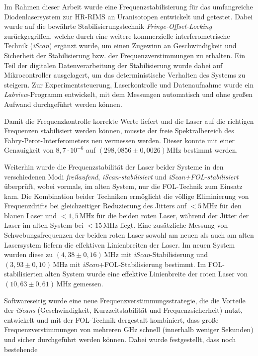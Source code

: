 Im Rahmen dieser Arbeit wurde eine Frequenzstabilisierung für das
umfangreiche Diodenlasersystem zur HR-RIMS an Uranisotopen entwickelt und
getestet. Dabei wurde auf die bewährte Stabilisierungstechnik \textit{Fringe-Offset-Locking} zurückgegriffen, welche
durch eine weitere kommerzielle interferometrische Technik (\textit{iScan})
ergänzt wurde, um einen Zugewinn an Geschwindigkeit und Sicherheit der Stabilisierung bzw. der
Frequenzverstimmungen zu erhalten.
Ein Teil der digitalen Datenverarbeitung der Stabilisierung wurde dabei auf
Mikrocontroller ausgelagert, um das deterministische Verhalten des Systems zu steigern. Zur
Experimentsteuerung, Laserkontrolle und Datenaufnahme wurde ein
\textit{Labview}-Programm entwickelt, mit dem Messungen
automatisch und ohne großen Aufwand durchgeführt werden können.\par
Damit die Frequenzkontrolle korrekte Werte liefert und die Laser auf die
richtigen Frequenzen stabilisiert werden können, musste der freie
Spektralbereich des Fabry-Perot-Interferometers neu vermessen werden. Dieser
konnte mit einer Genauigkeit von $8,7\cdot10^{-6}$ auf $(298,0856\pm0,0026)$MHz
bestimmt werden.\par
Weiterhin wurde die Frequenzstabilität der Laser beider
Systeme in den verschiedenen Modi \textit{freilaufend}, \textit{iScan-stabilisiert} und
\textit{iScan+FOL-stabilisiert} überprüft, wobei vormals, im alten System, nur
die FOL-Technik zum Einsatz kam. Die Kombination beider Techniken ermöglicht die
völlige Eliminierung von Frequenzdrifts bei gleichzeitiger Reduzierung des
Jitters auf $<5\,$MHz für den blauen Laser und $<1,5\,$MHz für die beiden roten
Laser, während der Jitter der Laser im alten System bei 
$<15\,$MHz liegt. Eine zusätzliche Messung von Schwebungsfrequenzen der beiden
roten Laser sowohl am neuen als auch am alten Lasersystem liefern die
effektiven Linienbreiten der Laser. Im neuen System wurden diese zu
$(4,38\pm0,16)\,$MHz mit \textit{iScan}-Stabilisierung und $(3,93\pm0,10)\,$MHz
mit \textit{iScan}+FOL-Stabilisierung bestimmt. Im FOL-stabilisierten alten
System wurde eine effektive Linienbreite der roten Laser von
$(10,63\pm0,61)\,$MHz gemessen.\par
Softwareseitig wurde eine neue Frequenzverstimmungsstrategie, die die
Vorteile der \textit{iScans} (Geschwindigkeit, Kurzzeitstabilität und Frequenzsicherheit)
nutzt, entwickelt und mit der FOL-Technik dergestalt kombiniert, dass große
Frequenzverstimmungen von mehreren GHz schnell (innerhalb weniger Sekunden) und sicher durchgeführt
werden können. Dabei wurde festgestellt, dass noch bestehende
